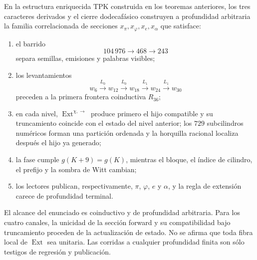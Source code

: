 \begin{theorem}
\label{thm:generacion-monodromica-conjunta-rev7}
En la estructura enriquecida TPK construida en los teoremas anteriores, los
tres caracteres derivados y el cierre dodecafásico construyen a profundidad
arbitraria la familia correlacionada de secciones
\(x_\pi,x_\varphi,x_e,x_\alpha\) que satisface:
\begin{enumerate}
 \item el barrido
 \[
 104\,976\longrightarrow468\longrightarrow243
 \]
 separa semillas, emisiones y palabras visibles;
 \item los levantamientos
 \[
 w_6\xrightarrow{L_0}w_{12}\xrightarrow{L_0}w_{18}
 \xrightarrow{L_1}w_{24}\xrightarrow{L_1}w_{30}
 \]
 preceden a la primera frontera coinductiva \(R_{36}\);
 \item en cada nivel,
 \(\operatorname{Ext}^{\chi,\rightarrow}\) produce primero el hijo
 compatible y su truncamiento coincide con el estado del nivel anterior; los
 \(729\) subcilindros numéricos forman una partición ordenada y la horquilla
 racional localiza después el hijo ya generado;
 \item la fase cumple \(g(K+9)=g(K)\), mientras el bloque, el índice de
 cilindro, el prefijo y la sombra de Witt cambian;
 \item los lectores publican, respectivamente, \(\pi\), \(\varphi\), \(e\)
 y \(\alpha\), y la regla de extensión carece de profundidad terminal.
\end{enumerate}
\end{theorem}

El alcance del enunciado es coinductivo y de profundidad arbitraria. Para los
cuatro canales, la unicidad de la sección forward y su compatibilidad bajo
truncamiento proceden de la actualización de estado. No se afirma que toda
fibra local de \(\operatorname{Ext}\) sea unitaria. Las corridas a cualquier
profundidad finita son sólo testigos de regresión y publicación.

